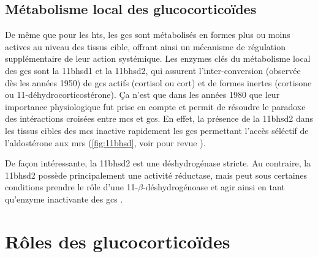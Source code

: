 \documentclass[../main.tex]{subfiles}
\begin{document}

\subsection{Métabolisme local des glucocorticoïdes}\label{subsec:local-gc-metabo}
De même que pour les \glspl{ht}, les \glspl{gc} sont métabolisés en formes plus ou moins actives au niveau des tissus cible, offrant ainsi un mécanisme de régulation supplémentaire de leur action systémique.
Les enzymes clés du métabolisme local des \glspl{gc} sont la \gls{11bhsd1}  et la \gls{11bhsd2}, qui assurent l'inter-conversion (observée dès les années 1950) de \glspl{gc} actifs (cortisol ou \gls{cort}) et de formes inertes (cortisone ou 11-déhydrocorticostérone).
Ça n'est que dans les années 1980 que leur importance physiologique fut prise en compte \citep{Edwards1988,Funder1988} et permit de résoudre le paradoxe des intéractions croisées entre \glspl{mc} et \glspl{gc}.
En effet, la présence de la \gls{11bhsd2} dans les tissus cibles des \glspl{mc} inactive rapidement les \glspl{gc} permettant l'accès séléctif de l'aldostérone aux \glspl{mr} (\autoref{fig:11bhsd}, voir pour revue \citealp{Seckl2001}).



De façon intéressante, la \gls{11bhsd2} est une déshydrogénase stricte.
Au contraire, la \gls{11bhsd2} possède principalement une activité réductase, mais peut sous certaines conditions prendre le rôle d'une 11-$\beta$-déshydrogénoase et agir ainsi en tant qu'enzyme inactivante des \glspl{gc} \citep{Phillips1989}.




\section{Rôles des glucocorticoïdes}

\end{document}
